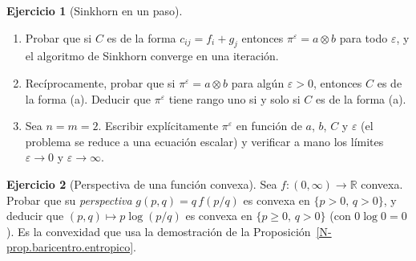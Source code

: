 \documentclass[11pt,a4paper]{amsart}
\newcounter{chapter}
\newcommand{\ve}{\varepsilon}
\newcommand{\R}{{\mathbb R}}
\theoremstyle{remark}
\theoremstyle{definition}
\newtheorem{ejercicio}{Ejercicio}[chapter]
\numberwithin{subsection}{section}
\numberwithin{equation}{section}
\begin{document}
\begin{ejercicio}[Sinkhorn en un paso]\label{ejer.sinkhorn.un.paso}
\leavevmode
\begin{enumerate}[label=(\alph*)]
\item Probar que si $C$ es de la forma $c_{ij}=f_i+g_j$ entonces
$\pi^\ve=a\otimes b$ para todo $\ve$, y el algoritmo de Sinkhorn converge en
una iteración.
\item Recíprocamente, probar que si $\pi^\ve=a\otimes b$ para algún
$\ve>0$, entonces $C$ es de la forma (a). Deducir que $\pi^\ve$ tiene rango
uno si y solo si $C$ es de la forma (a).
\item Sea $n=m=2$. Escribir explícitamente $\pi^\ve$ en función de $a$, $b$,
$C$ y $\ve$ (el problema se reduce a una ecuación escalar) y verificar a
mano los límites $\ve\to0$ y $\ve\to\infty$.
\end{enumerate}
\end{ejercicio}

\begin{ejercicio}[Perspectiva de una función convexa]\label{ejer.perspectiva}
Sea $f\colon(0,\infty)\to\R$ convexa. Probar que su \emph{perspectiva}
$g(p,q)=q\,f(p/q)$ es convexa en $\{p>0,\,q>0\}$, y deducir que
$(p,q)\mapsto p\log(p/q)$ es convexa en $\{p\ge0,\,q>0\}$ (con $0\log0=0$).
Es la convexidad que usa la demostración de la
Proposición~\ref{N-prop.baricentro.entropico}.
\end{ejercicio}
\end{document}
